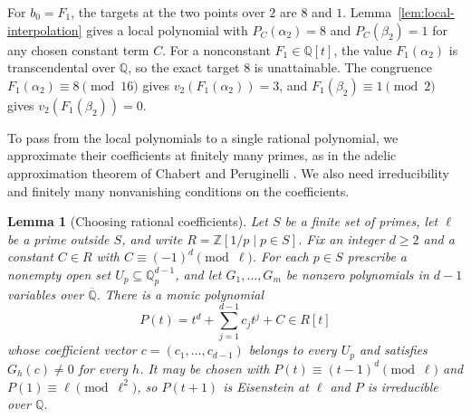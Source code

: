 \documentclass{article}
\newtheorem{lemma}[proposition]{Lemma}
\theoremstyle{remark}
\begin{document}
For $b_0 = F_1$, the targets at the two points over $2$ are $8$ and $1$.
Lemma~\ref{lem:local-interpolation} gives a local polynomial with $P_C(\alpha_2) = 8$ and $P_C(\beta_2) = 1$ for any chosen constant term $C$.
For a nonconstant $F_1 \in \mathbb{Q}[t]$, the value $F_1(\alpha_2)$ is transcendental over $\mathbb{Q}$, so the exact target $8$ is unattainable.
The congruence $F_1(\alpha_2) \equiv 8 \pmod{16}$ gives $v_2(F_1(\alpha_2)) = 3$, and $F_1(\beta_2) \equiv 1 \pmod{2}$ gives $v_2(F_1(\beta_2)) = 0$.

To pass from the local polynomials to a single rational polynomial, we approximate their coefficients at finitely many primes, as in the adelic approximation theorem of Chabert and Peruginelli \cite[Theorem~3.3 and Remark~3.4]{CPAdelic}.
We also need irreducibility and finitely many nonvanishing conditions on the coefficients.

\begin{lemma}[Choosing rational coefficients]
    \label{lem:rational-coefficients}
    Let $S$ be a finite set of primes, let $\ell$ be a prime outside $S$, and write $R = \mathbb{Z}[1/p \mid p \in S]$.
    Fix an integer $d \ge 2$ and a constant $C \in R$ with $C \equiv (-1)^d \pmod{\ell}$.
    For each $p \in S$ prescribe a nonempty open set $U_p \subseteq \mathbb{Q}_p^{d - 1}$, and let $G_1, \ldots, G_m$ be nonzero polynomials in $d - 1$ variables over $\overline{\mathbb{Q}}$.
    There is a monic polynomial
    \[
        P(t) = t^d + \sum_{j = 1}^{d - 1} c_j t^j + C \in R[t]
    \]
    whose coefficient vector $c = (c_1, \ldots, c_{d - 1})$ belongs to every $U_p$ and satisfies $G_h(c) \ne 0$ for every $h$.
    It may be chosen with $P(t) \equiv (t - 1)^d \pmod{\ell}$ and $P(1) \equiv \ell \pmod{\ell^2}$, so $P(t + 1)$ is Eisenstein at $\ell$ and $P$ is irreducible over $\mathbb{Q}$.
\end{lemma}
\end{document}
